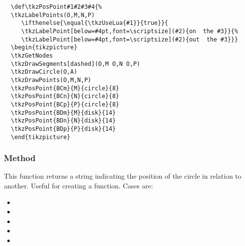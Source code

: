 \begin{minipage}{.5\textwidth}
  \begin{Verbatim}
  \def\tkzPosPoint#1#2#3#4{%
  \tkzLabelPoints(O,M,N,P)
     \ifthenelse{\equal{\tkzUseLua{#1}}{true}}{
     \tkzLabelPoint[below=#4pt,font=\scriptsize](#2){on  the #3}}{%
     \tkzLabelPoint[below=#4pt,font=\scriptsize](#2){out  the #3}}}    
  \begin{tikzpicture}
  \tkzGetNodes
  \tkzDrawSegments[dashed](O,M O,N O,P)
  \tkzDrawCircle(O,A)
  \tkzDrawPoints(O,M,N,P)
  \tkzPosPoint{BCm}{M}{circle}{8}
  \tkzPosPoint{BCn}{N}{circle}{8}
  \tkzPosPoint{BCp}{P}{circle}{8}
  \tkzPosPoint{BDm}{M}{disk}{14}
  \tkzPosPoint{BDn}{N}{disk}{14}
  \tkzPosPoint{BDp}{P}{disk}{14}
  \end{tikzpicture}
  \end{Verbatim}
\end{minipage}


\subsubsection{Method } %
\label{ssub:circles_position}

This function returns a string indicating the position of the circle in relation to another. Useful for creating a function. Cases are:

\begin{itemize}
   \item {}
   \item {}
   \item {}
   \item {}
   \item {}
\end{itemize}

